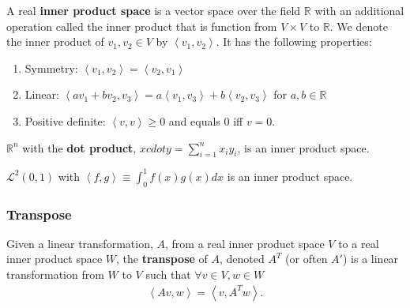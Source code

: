 \documentclass[compress]{beamer}
\def\R{\mathbb{R}}
\newcommand{\iprod}[2]{\left\langle {#1} , {#2} \right\rangle}
\theoremstyle{definition}
\begin{document}
\begin{frame}
  \begin{definition}
    A real \textbf{inner product space} is a vector space over the field
    $\R$ with an additional operation called the inner product that is
    function from $V \times V$ to $\mathbb{R}$. We denote the inner
    product of $v_1, v_2 \in V$ by $\iprod{v_1}{v_2}$. It has the
    following properties:
    \begin{enumerate}
    \item Symmetry: $\iprod{v_1}{v_2} = \iprod{v_2}{v_1}$
    \item Linear: $\iprod{a v_1 + b v_2}{v_3} = a \iprod{v_1}{v_3} + b
      \iprod{v_2}{v_3}$ for $a, b \in \R$
    \item Positive definite: $\iprod{v}{v} \geq 0$ and equals $0$ iff
      $v=0$. 
    \end{enumerate}  
  \end{definition}
\end{frame}

\begin{frame}
  \begin{example}
    $\R^n$ with the \textbf{dot product}, $x cdot y = \sum_{i=1}^n x_i
    y_i$, is an inner product space. 
  \end{example}
  
  \begin{example}
    $\mathcal{L}^2(0,1)$ with $\iprod{f}{g} \equiv \int_0^1 f(x) g(x)
    dx$ is an inner product space.
  \end{example}
\end{frame}

\begin{frame}
  \frametitle{Transpose}
  \begin{definition}
    Given a linear transformation, $A$, from a real inner product space
    $V$ to a real inner product space $W$, the
    \textbf{transpose} of $A$, denoted $A^T$ (or often $A'$) is a
    linear transformation from $W$ to $V$ such that $\forall v \in V, w
    \in W$
    \begin{align*}
      \iprod{A v}{w} = \iprod{v}{A^T w}.
    \end{align*}
  \end{definition}
\end{frame}
\end{document}
